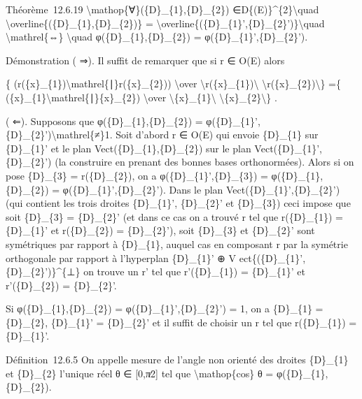 \documentclass[]{article}
\begin{document}
Théorème~12.6.19 \textbackslash{}mathop\{∀\}(\{D\}\_\{1\},\{D\}\_\{2\})
∈D\{(E)\}\^{}\{2\}\textbackslash{}quad
\textbackslash{}overline\{(\{D\}\_\{1\},\{D\}\_\{2\})\} =
\textbackslash{}overline\{(\{D\}\_\{1\}',\{D\}\_\{2\}')\}\textbackslash{}quad
\textbackslash{}mathrel\{⇔\} \textbackslash{}quad
φ(\{D\}\_\{1\},\{D\}\_\{2\}) = φ(\{D\}\_\{1\}',\{D\}\_\{2\}').

Démonstration ( ⇒). Il suffit de remarquer que si r ∈ O(E) alors

\{
\textbar{}(r(\{x\}\_\{1\})\textbackslash{}mathrel\{∣\}r(\{x\}\_\{2\}))\textbar{}
\textbackslash{}over
\textbackslash{}\textbar{}r(\{x\}\_\{1\})\textbackslash{}\textbar{}
\textbackslash{}\textbar{}r(\{x\}\_\{2\})\textbackslash{}\textbar{}\}
=\{
\textbar{}(\{x\}\_\{1\}\textbackslash{}mathrel\{∣\}\{x\}\_\{2\})\textbar{}
\textbackslash{}over
\textbackslash{}\textbar{}\{x\}\_\{1\}\textbackslash{}\textbar{}
\textbackslash{}\textbar{}\{x\}\_\{2\}\textbackslash{}\textbar{}\} .

( ⇐). Supposons que φ(\{D\}\_\{1\},\{D\}\_\{2\}) =
φ(\{D\}\_\{1\}',\{D\}\_\{2\}')\textbackslash{}mathrel\{≠\}1. Soit
d'abord r ∈ O(E) qui envoie \{D\}\_\{1\} sur \{D\}\_\{1\}' et le plan
Vect(\{D\}\_\{1\},\{D\}\_\{2\}) sur le plan
Vect(\{D\}\_\{1\}',\{D\}\_\{2\}') (la construire en prenant des bonnes
bases orthonormées). Alors si on pose \{D\}\_\{3\} = r(\{D\}\_\{2\}), on
a φ(\{D\}\_\{1\}',\{D\}\_\{3\}) = φ(\{D\}\_\{1\},\{D\}\_\{2\}) =
φ(\{D\}\_\{1\}',\{D\}\_\{2\}'). Dans le plan
Vect(\{D\}\_\{1\}',\{D\}\_\{2\}') (qui contient les trois droites
\{D\}\_\{1\}', \{D\}\_\{2\}' et \{D\}\_\{3\}) ceci impose que soit
\{D\}\_\{3\} = \{D\}\_\{2\}' (et dans ce cas on a trouvé r tel que
r(\{D\}\_\{1\}) = \{D\}\_\{1\}' et r(\{D\}\_\{2\}) = \{D\}\_\{2\}'),
soit \{D\}\_\{3\} et \{D\}\_\{2\}' sont symétriques par rapport à
\{D\}\_\{1\}, auquel cas en composant r par la symétrie orthogonale par
rapport à l'hyperplan \{D\}\_\{1\}' ⊕ V
ect\{(\{D\}\_\{1\}',\{D\}\_\{2\}')\}\^{}\{⊥\} on trouve un r' tel que
r'(\{D\}\_\{1\}) = \{D\}\_\{1\}' et r'(\{D\}\_\{2\}) = \{D\}\_\{2\}'.

Si φ(\{D\}\_\{1\},\{D\}\_\{2\}) = φ(\{D\}\_\{1\}',\{D\}\_\{2\}') = 1, on
a \{D\}\_\{1\} = \{D\}\_\{2\}, \{D\}\_\{1\}' = \{D\}\_\{2\}' et il
suffit de choisir un r tel que r(\{D\}\_\{1\}) = \{D\}\_\{1\}'.

Définition~12.6.5 On appelle mesure de l'angle non orienté des droites
\{D\}\_\{1\} et \{D\}\_\{2\} l'unique réel θ ∈ {[}0,π∕2{]} tel que
\textbackslash{}mathop\{cos\} θ = φ(\{D\}\_\{1\},\{D\}\_\{2\}).
\end{document}

